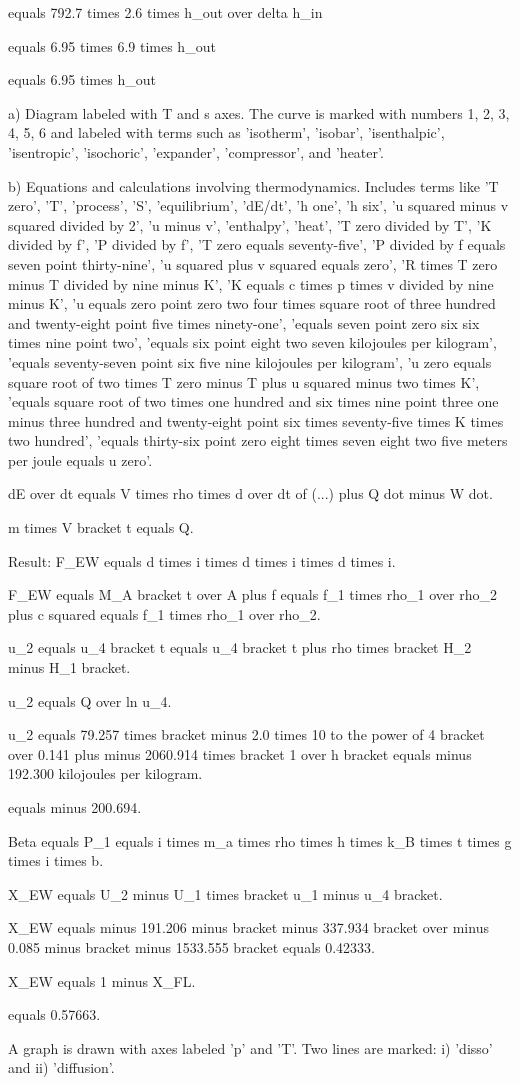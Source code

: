 equals 792.7 times 2.6 times h_out over delta h_in

equals 6.95 times 6.9 times h_out

equals 6.95 times h_out

a) Diagram labeled with T and s axes. The curve is marked with numbers 1, 2, 3, 4, 5, 6 and labeled with terms such as 'isotherm', 'isobar', 'isenthalpic', 'isentropic', 'isochoric', 'expander', 'compressor', and 'heater'.

b) Equations and calculations involving thermodynamics. Includes terms like 'T zero', 'T', 'process', 'S', 'equilibrium', 'dE/dt', 'h one', 'h six', 'u squared minus v squared divided by 2', 'u minus v', 'enthalpy', 'heat', 'T zero divided by T', 'K divided by f', 'P divided by f', 'T zero equals seventy-five', 'P divided by f equals seven point thirty-nine', 'u squared plus v squared equals zero', 'R times T zero minus T divided by nine minus K', 'K equals c times p times v divided by nine minus K', 'u equals zero point zero two four times square root of three hundred and twenty-eight point five times ninety-one', 'equals seven point zero six six times nine point two', 'equals six point eight two seven kilojoules per kilogram', 'equals seventy-seven point six five nine kilojoules per kilogram', 'u zero equals square root of two times T zero minus T plus u squared minus two times K', 'equals square root of two times one hundred and six times nine point three one minus three hundred and twenty-eight point six times seventy-five times K times two hundred', 'equals thirty-six point zero eight times seven eight two five meters per joule equals u zero'.

dE over dt equals V times rho times d over dt of (...) plus Q dot minus W dot.

m times V bracket t equals Q.

Result: F_EW equals d times i times d times i times d times i.

F_EW equals M_A bracket t over A plus f equals f_1 times rho_1 over rho_2 plus c squared equals f_1 times rho_1 over rho_2.

u_2 equals u_4 bracket t equals u_4 bracket t plus rho times bracket H_2 minus H_1 bracket.

u_2 equals Q over ln u_4.

u_2 equals 79.257 times bracket minus 2.0 times 10 to the power of 4 bracket over 0.141 plus minus 2060.914 times bracket 1 over h bracket equals minus 192.300 kilojoules per kilogram.

equals minus 200.694.

Beta equals P_1 equals i times m_a times rho times h times k_B times t times g times i times b.

X_EW equals U_2 minus U_1 times bracket u_1 minus u_4 bracket.

X_EW equals minus 191.206 minus bracket minus 337.934 bracket over minus 0.085 minus bracket minus 1533.555 bracket equals 0.42333.

X_EW equals 1 minus X_FL.

equals 0.57663.

A graph is drawn with axes labeled 'p' and 'T'. Two lines are marked: i) 'disso' and ii) 'diffusion'.